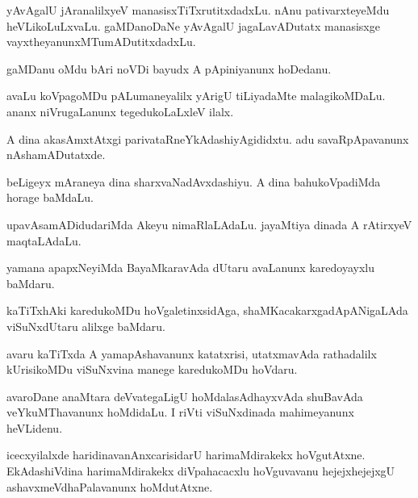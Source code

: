 \begin{mng}
yAvAgalU jAranalilxyeV manasisxTiTxrutitxdadxLu. nAnu pativarxteyeMdu heVLikoLuLxvaLu. gaMDanoDaNe yAvAgalU jagaLavADutatx manasisxge vayxtheyanunxMTumADutitxdadxLu.
\end{mng}

\begin{mng}
gaMDanu oMdu bAri noVDi bayudx A pApiniyanunx hoDedanu.
\end{mng}

\begin{mng}
avaLu koVpagoMDu pALumaneyalilx yArigU  tiLiyadaMte malagikoMDaLu. ananx niVrugaLanunx tegedukoLaLxleV ilalx.
\end{mng}

\begin{mng}
A dina akasAmxtAtxgi parivataRneYkAdashiyAgididxtu. adu savaRpApavanunx nAshamADutatxde.
\end{mng}

\begin{mng}
beLigeyx mAraneya dina sharxvaNadAvxdashiyu. A dina bahukoVpadiMda horage baMdaLu.
\end{mng}

\begin{mng}
upavAsamADidudariMda Akeyu nimaRlaLAdaLu. jayaMtiya dinada A rAtirxyeV maqtaLAdaLu.
\end{mng}

\begin{mng}
yamana apapxNeyiMda BayaMkaravAda dUtaru avaLanunx karedoyayxlu baMdaru.
\end{mng}

\begin{mng}
kaTiTxhAki karedukoMDu hoVgaletinxsidAga, shaMKacakarxgadApANigaLAda viSuNxdUtaru alilxge baMdaru.
\end{mng}

\begin{mng}
avaru kaTiTxda A yamapAshavanunx katatxrisi, utatxmavAda rathadalilx kUrisikoMDu viSuNxvina manege karedukoMDu hoVdaru.
\end{mng}

\begin{mng}
avaroDane anaMtara deVvategaLigU hoMdalasAdhayxvAda shuBavAda veYkuMThavanunx hoMdidaLu. I riVti viSuNxdinada mahimeyanunx heVLidenu.
\end{mng}

\begin{mng}
icecxyilalxde haridinavanAnxcarisidarU harimaMdirakekx hoVgutAtxne. EkAdashiVdina harimaMdirakekx diVpahacacxlu hoVguvavanu hejejxhejejxgU ashavxmeVdhaPalavanunx hoMdutAtxne.
\end{mng}

